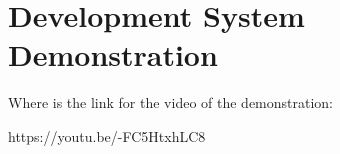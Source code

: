 \newpage

\section{Development System Demonstration}

\quad Where is the link for the video of the demonstration:

\textbullet https://youtu.be/-FC5HtxhLC8